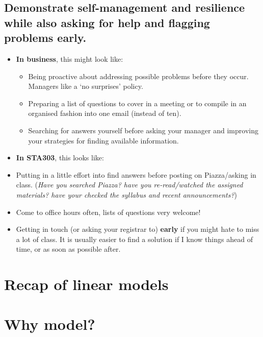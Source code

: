 \documentclass[
]{book}
\providecommand{\tightlist}{%
  \setlength{\itemsep}{0pt}\setlength{\parskip}{0pt}}
\begin{document}
\hypertarget{demonstrate-self-management-and-resilience-while-also-asking-for-help-and-flagging-problems-early.}{%
\subsection{Demonstrate self-management and resilience while also asking for help and flagging problems early.}\label{demonstrate-self-management-and-resilience-while-also-asking-for-help-and-flagging-problems-early.}}

\begin{itemize}
\tightlist
\item
  \textbf{In business}, this might look like:

  \begin{itemize}
  \tightlist
  \item
    Being proactive about addressing possible problems before they occur. Managers like a `no surprises' policy.
  \item
    Preparing a list of questions to cover in a meeting or to compile in an organised fashion into one email (instead of ten).
  \item
    Searching for answers yourself before asking your manager and improving your strategies for finding available information.
  \end{itemize}
\item
  \textbf{In STA303}, this looks like:
\item
  Putting in a little effort into find answers before posting on Piazza/asking in class. (\emph{Have you searched Piazza? have you re-read/watched the assigned materials? have your checked the syllabus and recent announcements?})
\item
  Come to office hours often, lists of questions very welcome!
\item
  Getting in touch (or asking your registrar to) \textbf{early} if you might hate to miss a lot of class. It is usually easier to find a solution if I know things ahead of time, or as soon as possible after.
\end{itemize}

\hypertarget{recap-of-linear-models}{%
\section{Recap of linear models}\label{recap-of-linear-models}}

\hypertarget{why-model}{%
\section{Why model?}\label{why-model}}
\end{document}
